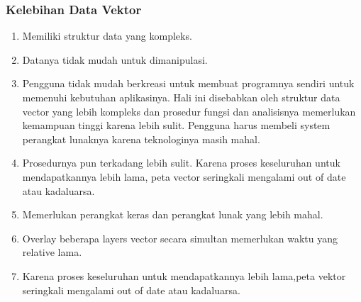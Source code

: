 \begin{enumerate}
\subsubsection{Kelebihan Data Vektor}
\begin{enumerate}
kekurangan data vector dibandingkan data raster
terdapat keterbatasan masalah akurasi dan presisi data terutama dalam menentukan ukuran piksel. Data vector memiliki keterbatasan dalam ukuran penyimpanan atau kapasitas hasil.
\item Memiliki struktur data yang kompleks.
\item Datanya tidak mudah untuk dimanipulasi.
\item Pengguna tidak mudah berkreasi untuk membuat programnya sendiri untuk memenuhi kebutuhan aplikasinya. Hali ini disebabkan oleh struktur data vector yang lebih kompleks dan prosedur fungsi dan analisisnya memerlukan kemampuan tinggi karena lebih sulit. Pengguna harus membeli system perangkat lunaknya karena teknologinya masih mahal.
\item Prosedurnya pun terkadang lebih sulit. Karena proses keseluruhan untuk mendapatkannya lebih lama, peta vector seringkali mengalami out of date atau kadaluarsa.
\item Memerlukan perangkat keras dan perangkat lunak yang lebih mahal.
\item Overlay beberapa layers vector secara simultan memerlukan waktu yang relative lama.
\item Karena proses keseluruhan untuk mendapatkannya lebih lama,peta vektor seringkali mengalami out of date atau kadaluarsa.
\end{enumerate}


\end{enumerate}
